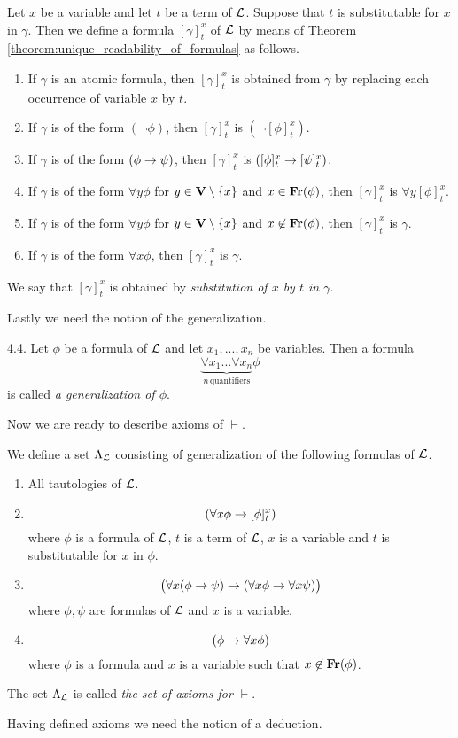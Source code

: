 \documentclass[10pt]{amsart}
\begin{document}
\begin{definition}
	Let $x$ be a variable and let $t$ be a term of ${\mathcal L}$. Suppose that $t$ is substitutable for $x$ in $\gamma$. Then we define a formula $[\gamma]^x_t$ of ${\mathcal L}$ by means of Theorem \ref{theorem:unique_readability_of_formulas} as follows.
	\begin{enumerate}[label=\textbf{(\arabic*)}, leftmargin=3.0em]
		\item If $\gamma$ is an atomic formula, then $[\gamma]^x_t$ is obtained from $\gamma$ by replacing each occurrence of variable $x$ by $t$.
		\item If $\gamma$ is of the form $(\neg \phi)$, then $[\gamma]^x_t$ is $(\neg [\phi]^x_t)$.
		\item If $\gamma$ is of the form $(\phi \rightarrow \psi)$, then $[\gamma]^x_t$ is $([\phi]^x_t \rightarrow [\psi]^x_t)$.
		\item If $\gamma$ is of the form $\forall y \phi$ for $y \in \mathbf{V}\setminus \{x\}$ and $x\in \mathbf{Fr}(\phi)$, then $[\gamma]^x_t$ is $\forall y [\phi]^x_t$.
		\item If $\gamma$ is of the form $\forall y \phi$ for $y \in \mathbf{V}\setminus \{x\}$ and $x\not \in \mathbf{Fr}(\phi)$, then $[\gamma]^x_t$ is $\gamma$.
		\item If $\gamma$ is of the form $\forall x\phi$, then $[\gamma]^x_t$ is $\gamma$.
	\end{enumerate}
	We say that $[\gamma]^x_t$ is obtained by \textit{substitution of $x$ by $t$ in $\gamma$}.
\end{definition}
\noindent
Lastly we need the notion of the generalization.

\begin{definition} 4.4. Let $\phi$ be a formula of ${\mathcal L}$ and let $x_1,...,x_n$ be variables. Then a formula
	$$\underbrace{\forall x_1 ...\forall x_n}_{n\,\mathrm{quantifiers}} \phi$$
	is called \textit{a generalization of $\phi$}.
\end{definition}
\noindent
Now we are ready to describe axioms of $\vdash$.

\begin{definition}
	We define a set $\Lambda_{{\mathcal L}}$ consisting of generalization of the following formulas of ${\mathcal L}$.
	\begin{enumerate}[label=\textbf{(\arabic*)}, leftmargin=3.0em]
		\item All tautologies of ${\mathcal L}$.
		\item
		      $$\left(\forall x\phi \rightarrow [\phi]^x_t\right)$$
		      where $\phi$ is a formula of ${\mathcal L}$, $t$ is a term of ${\mathcal L}$, $x$ is a variable and $t$ is substitutable for $x$ in $\phi$.
		\item
		      $$\big(\forall x(\phi \rightarrow \psi) \rightarrow (\forall x\phi \rightarrow \forall x\psi)\big)$$
		      where $\phi, \psi$ are formulas of ${\mathcal L}$ and $x$ is a variable.
		\item
		      $$(\phi \rightarrow \forall x\phi)$$
		      where $\phi$ is a formula and $x$ is a variable such that $x \not \in \mathbf{Fr}(\phi)$.
	\end{enumerate}
	The set $\Lambda_{\mathcal L}$ is called \textit{the set of axioms for $\vdash$}.
\end{definition}
\noindent
Having defined axioms we need the notion of a deduction.
\end{document}
